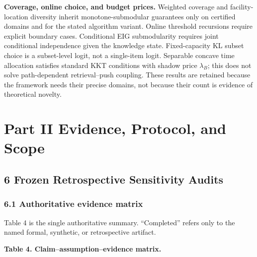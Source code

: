 \documentclass[
  11pt]{article}
\begin{document}
\textbf{Coverage, online choice, and budget prices.} Weighted coverage
and facility-location diversity inherit monotone-submodular guarantees
only on certified domains and for the stated algorithm variant. Online
threshold recursions require explicit boundary cases. Conditional EIG
submodularity requires joint conditional independence given the
knowledge state. Fixed-capacity KL subset choice is a subset-level
logit, not a single-item logit. Separable concave time allocation
satisfies standard KKT conditions with shadow price \(\lambda_B\); this
does not solve path-dependent retrieval--push coupling. These results
are retained because the framework needs their precise domains, not
because their count is evidence of theoretical novelty.

\section{Part II Evidence, Protocol, and
Scope}\label{part-ii-evidence-protocol-and-scope}

\subsection{6 Frozen Retrospective Sensitivity
Audits}\label{frozen-retrospective-sensitivity-audits}

\subsubsection{6.1 Authoritative evidence
matrix}\label{authoritative-evidence-matrix}

Table 4 is the single authoritative summary. ``Completed'' refers only
to the named formal, synthetic, or retrospective artifact.

\textbf{Table 4. Claim--assumption--evidence matrix.}
\end{document}
